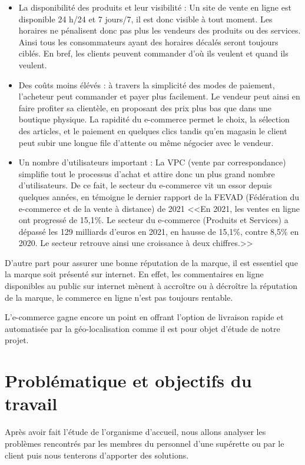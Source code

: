 \documentclass{report}
\begin{document}
\begin{itemize}
    \item La disponibilité des produits et leur visibilité : Un site de vente en ligne est disponible 24 h/24 et 7 jours/7, il est donc visible à tout moment. Les horaires ne pénalisent donc pas plus les vendeurs des produits ou des services. Ainsi tous les consommateurs ayant des horaires décalés seront toujours ciblés. En bref, les clients peuvent commander d'où ils veulent et quand ils veulent.
    \item Des coûts moins élévés : à travers la simplicité des modes de paiement, l'acheteur peut commander et payer plus facilement. Le vendeur peut ainsi en faire profiter sa clientèle, en proposant des prix plus bas que dans une boutique physique. La rapidité du e-commerce permet le choix, la sélection des articles, et le paiement en quelques clics tandis qu’en magasin le client peut subir une longue file d’attente ou même négocier avec le vendeur.
    \item Un nombre d’utilisateurs important : La VPC (vente par correspondance) simplifie tout le processus d’achat et attire donc un plus grand nombre d'utilisateurs. De ce fait, le secteur du e-commerce vit un essor depuis quelques années, en témoigne le dernier rapport de la FEVAD (Fédération du e-commerce et de la vente à distance) de 2021 <<En 2021, les ventes en ligne ont progressé de 15,1\%. Le secteur du e-commerce (Produits et Services) a dépassé les 129 milliards d'euros en 2021, en hausse de 15,1\%, contre 8,5\% en 2020. Le secteur retrouve ainsi une croissance à deux chiffres.>>
\end{itemize}

D’autre part pour assurer une bonne réputation de la marque, il est essentiel que la marque soit présenté sur internet. En effet, les commentaires en ligne disponibles au public sur internet mènent à accroître ou à décroître la réputation de la marque, le commerce en ligne n’est pas toujours rentable.

L'e-commerce gagne encore un point en offrant l'option de livraison rapide et automatisée par la géo-localisation comme il est pour objet d'étude de notre projet.

\section{Problématique et objectifs du travail}
Après avoir fait l’étude de l’organisme d’accueil, nous allons analyser les problèmes rencontrés par les membres du personnel d’une supérette ou par le client puis nous tenterons d’apporter des solutions.
\end{document}
